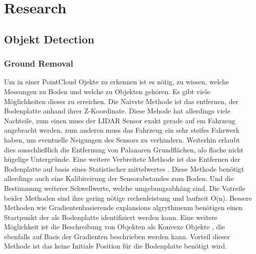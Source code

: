 \documentclass[11pt,oneside,openright]{mpreport}
\begin{document}


\chapter{Research}

\section{Objekt Detection}

\subsection{Ground Removal}
Um in einer PointCloud Ojekte zu erkennen ist es nötig, zu wissen, welche Messungen zu Boden und welche zu Objekten gehören. Es gibt viele Möglichkeiten dieses
zu erreichen. Die Naivste Methode ist das entfernen, der Bodenplatte anhand ihrer Z-Koordinate. Diese Mehode hat allerdings viele Nachteile, zum einen muss
der LIDAR Sensor exakt gerade auf em Fahrzeug angebracht werden, zum anderen muss das Fahrzeug ein sehr steifes Fahrwerk haben, um eventuelle Neigungen des Sensors zu verhindern.
Weiterhin erlaubt dies ausschließlich die Entfernung von Palanaren Grundflächen, alo flache nicht hügelige Untergründe. Eine weitere Verbreitete Methode ist das 
Entfernen der Bodenplatte auf basis eines Statistischer mittelwertes \cite{Zhang}.  Diese Methode benötigt allerdings auch eine Kalibireirung der Sensorabstandes zum Boden.
Und die Bestimmung weiterer Schwellwerte, welche umgebungsabhäng sind. Die Votreile beider Methoden sind ihre gering nötige rechenleistung und laufzeit O(n).
Bessere Methoden wie Gradientenbasierende explansions algrythmenm benötigen einen Startpunkt der als Bodenplatte identifiziert werden kann.
Eine weitere Möglichkeit ist die Beschreibung von Objekten als Konvexe Objekte \cite{5164280}, die ebenfalls auf Basis der Gradienten beschrieben werden kann.
Vorteil dieser Methode ist das keine Initiale Position für die Bodenplatte benötigt wird.
\end{document}
